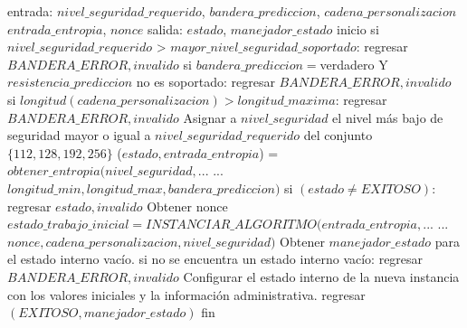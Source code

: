 \begin{description}
    \begin{pseudocodigo}[caption={DRBG, instanciación.}, label={drbg:1}]
      entrada:  $nivel\_seguridad\_requerido$, $bandera\_prediccion$, $cadena\_personalizacion$
                $entrada\_entropia$, $nonce$
      salida:   $estado$, $manejador\_estado$
      inicio
        si $nivel\_seguridad\_requerido$ > $mayor\_nivel\_seguridad\_soportado$:
          regresar $BANDERA\_ERROR, invalido$
        si $bandera\_prediccion = $verdadero Y $resistencia\_prediccion$ no es soportado:
          regresar $BANDERA\_ERROR, invalido$
        si $longitud(cadena\_personalizacion) > longitud\_maxima$:
          regresar $BANDERA\_ERROR, invalido$
        Asignar a $nivel\_seguridad$ el nivel más bajo de seguridad mayor o igual
          a $nivel\_seguridad\_requerido$ del conjunto $\{112, 128, 192, 256\}$
        ($estado, entrada\_entropia$) = $obtener\_entropia(nivel\_seguridad,$...
          ... $longitud\_min, longitud\_max, bandera\_prediccion)$
        si $(estado \neq EXITOSO)$:
          regresar $estado, invalido$
        Obtener nonce
        $estado\_trabajo\_inicial = INSTANCIAR\_ALGORITMO(entrada\_entropia,$...
          ... $nonce, cadena\_personalizacion, nivel\_seguridad)$
        Obtener $manejador\_estado$ para el estado interno vacío. 
        si no se encuentra un estado interno vacío:
          regresar $BANDERA\_ERROR, invalido$
        Configurar el estado interno de la nueva instancia con los valores iniciales
          y la información administrativa.
        regresar $(EXITOSO, manejador\_estado)$
      fin
    \end{pseudocodigo}


\end{description}
